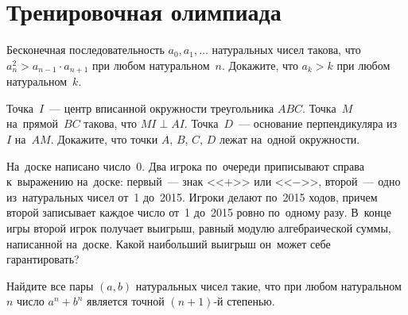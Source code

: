 
\section*{Тренировочная олимпиада}


\begin{problems}

\item
Бесконечная последовательность $a_0, a_1, \ldots$ натуральных чисел такова, что
\(
    a_{n}^2 > a_{n-1} \cdot a_{n+1}
\)
при любом натуральном~$n$.
Докажите, что $a_k > k$ при любом натуральном~$k$.

\item
Точка~$I$~--- центр вписанной окружности треугольника $ABC$.
Точка~$M$ на~прямой~$BC$ такова, что $MI \perp AI$.
Точка~$D$~--- основание перпендикуляра из~$I$ на~$AM$.
Докажите, что точки $A$, $B$, $C$, $D$ лежат на~одной окружности.

\item
На~доске написано число~0.
Два игрока по~очереди приписывают справа к~выражению на~доске:
первый~--- знак <<$+$>> или <<$-$>>, второй~--- одно из~натуральных чисел
от~1 до~2015.
Игроки делают по~2015 ходов, причем второй записывает каждое число от~1 до~2015
ровно по~одному разу.
В~конце игры второй игрок получает выигрыш, равный модулю алгебраической суммы,
написанной на~доске.
Какой наибольший выигрыш он~может себе гарантировать?

\item
Найдите все пары $(a, b)$ натуральных чисел такие, что при любом
натуральном~$n$ число $a^n + b^n$ является точной $(n + 1)$-й степенью.

\end{problems}

